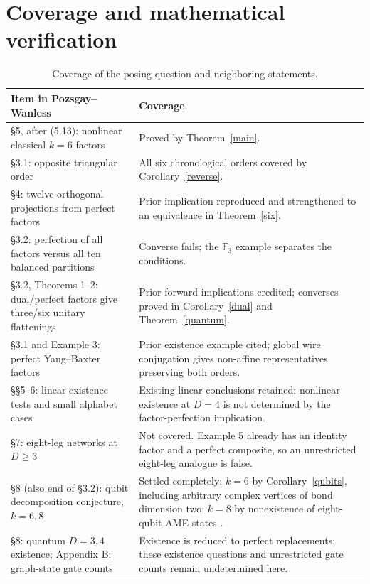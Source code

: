 \documentclass[11pt]{article}
\begin{document}
\section{Coverage and mathematical verification}
\begin{table}[ht]
\centering\small
\begin{tabular}{@{}p{.35\linewidth}p{.60\linewidth}@{}}
\toprule
Item in Pozsgay--Wanless \cite{PW} & Coverage\\
\midrule
\S5, after (5.13): nonlinear classical $k=6$ factors
 & Proved by Theorem~\ref{main}.\\
\S3.1: opposite triangular order
 & All six chronological orders covered by Corollary~\ref{reverse}.\\
\S4: twelve orthogonal projections from perfect factors
 & Prior implication reproduced and strengthened to an equivalence in
   Theorem~\ref{six}.\\
\S3.2: perfection of all factors versus all ten balanced partitions
 & Converse fails; the $\mathbb F_3$ example separates the conditions.\\
\S3.2, Theorems 1--2: dual/perfect factors give three/six unitary flattenings
 & Prior forward implications credited; converses proved in
   Corollary~\ref{dual} and Theorem~\ref{quantum}.\\
\S3.1 and Example 3: perfect Yang--Baxter factors
 & Prior existence example cited; global wire conjugation gives
   non-affine representatives preserving both orders.\\
\S\S5--6: linear existence tests and small alphabet cases
 & Existing linear conclusions retained; nonlinear existence at $D=4$
   is not determined by the factor-perfection implication.\\
\S7: eight-leg networks at $D\ge3$
 & Not covered. Example 5 already has an identity factor and a perfect
   composite, so an unrestricted eight-leg analogue is false.\\
\S8 (also end of \S3.2): qubit decomposition conjecture, $k=6,8$
 & Settled completely: $k=6$ by Corollary~\ref{qubits}, including arbitrary
   complex vertices of bond dimension two; $k=8$ by nonexistence of
   eight-qubit AME states \cite{Rains,Scott}.\\
\S8: quantum $D=3,4$ existence; Appendix B: graph-state gate counts
 & Existence is reduced to perfect replacements; these existence
   questions and unrestricted gate counts remain undetermined here.\\
\bottomrule
\end{tabular}
\caption{Coverage of the posing question and neighboring statements.}
\label{coverage}
\end{table}
\end{document}
